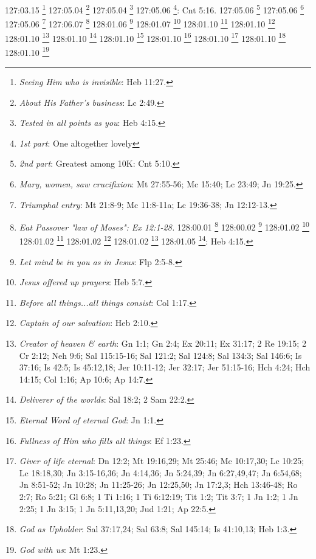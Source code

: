 {{{{{{{{{{{{{{{{{{{{{{{{{{{{{{127:03.15 \footnote{\textit{Seeing Him who is invisible}: Heb 11:27.}
127:05.04 \footnote{\textit{About His Father's business}: Lc 2:49.}
127:05.04 \footnote{\textit{Tested in all points as you}: Heb 4:15.}
127:05.06 \footnote{\textit{1st part}: One altogether lovely}: Cnt 5:16.}
127:05.06 \footnote{\textit{2nd part}: Greatest among 10K: Cnt 5:10.}
127:05.06 \footnote{\textit{Mary, women, saw crucifixion}: Mt 27:55-56; Mc 15:40; Lc 23:49; Jn 19:25.}
127:05.06 \footnote{\textit{Triumphal entry}: Mt 21:8-9; Mc 11:8-11a; Lc 19:36-38; Jn 12:12-13.}
127:06.07 \footnote{\textit{Eat Passover "law of Moses": Ex 12:1-28.}
128:00.01 \footnote{\textit{Jesus lived human life}: Heb 2:14-18; Heb 4:15.}
128:00.02 \footnote{\textit{Jesus experienced living}: Heb 2:9-10.}
128:01.02 \footnote{\textit{In all things tested as you are}: Heb 4:15.}
128:01.02 \footnote{\textit{Son of man}: Mt 8:20.}
128:01.02 \footnote{\textit{Son of Man}: Ez 2:1,3,6,8; Ez 3:1-4,10,17; Dn 7:13-14; Mc 2:10; Lc 5:24; Jn 1:51; Ap 1:13; Ap 14:14; 1 Hen 46:1-6; 1 Hen 48:2; 1 Hen 60:10; 1 Hen 62:1-14; 1 Hen 63:11; 1 Hen 69:26-29; 1 Hen 70:1-2; 1 Hen 71:14-16.}
128:01.02 \footnote{\textit{Word made flesh}: Jn 1:14.}
128:01.05 \footnote{\textit{Touched}: feelings of infirmities}: Heb 4:15.}
128:01.06 \footnote{\textit{Let mind be in you as in Jesus}: Flp 2:5-8.}
128:01.07 \footnote{\textit{Jesus offered up prayers}: Heb 5:7.}
128:01.10 \footnote{\textit{Before all things...all things consist}: Col 1:17.}
128:01.10 \footnote{\textit{Captain of our salvation}: Heb 2:10.}
128:01.10 \footnote{\textit{Creator of heaven & earth}: Gn 1:1; Gn 2:4; Ex 20:11; Ex 31:17; 2 Re 19:15; 2 Cr 2:12; Neh 9:6; Sal 115:15-16; Sal 121:2; Sal 124:8; Sal 134:3; Sal 146:6; Is 37:16; Is 42:5; Is 45:12,18; Jer 10:11-12; Jer 32:17; Jer 51:15-16; Hch 4:24; Hch 14:15; Col 1:16; Ap 10:6; Ap 14:7.}
128:01.10 \footnote{\textit{Deliverer of the worlds}: Sal 18:2; 2 Sam 22:2.}
128:01.10 \footnote{\textit{Eternal Word of eternal God}: Jn 1:1.}
128:01.10 \footnote{\textit{Fullness of Him who fills all things}: Ef 1:23.}
128:01.10 \footnote{\textit{Giver of life eternal}: Dn 12:2; Mt 19:16,29; Mt 25:46; Mc 10:17,30; Lc 10:25; Lc 18:18,30; Jn 3:15-16,36; Jn 4:14,36; Jn 5:24,39; Jn 6:27,49,47; Jn 6:54,68; Jn 8:51-52; Jn 10:28; Jn 11:25-26; Jn 12:25,50; Jn 17:2,3; Hch 13:46-48; Ro 2:7; Ro 5:21; Gl 6:8; 1 Ti 1:16; 1 Ti 6:12:19; Tit 1:2; Tit 3:7; 1 Jn 1:2; 1 Jn 2:25; 1 Jn 3:15; 1 Jn 5:11,13,20; Jud 1:21; Ap 22:5.}
128:01.10 \footnote{\textit{God as Upholder}: Sal 37:17,24; Sal 63:8; Sal 145:14; Is 41:10,13; Heb 1:3.}
128:01.10 \footnote{\textit{God with us}: Mt 1:23.}
}}}}}}}}}}}}}}}}}}}}}}}}}}}}}

